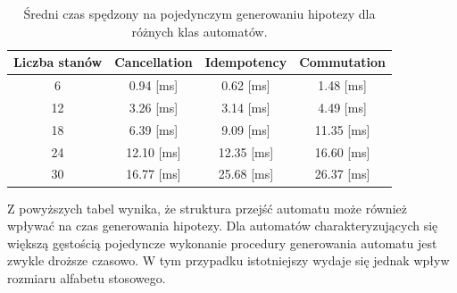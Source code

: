 \begin{table}[h]
    \centering
    \begin{tabular}{c|ccc}
        \hline
        Liczba stanów & Cancellation & Idempotency & Commutation \\
        \hline
        6 & 0.94 [ms] & 0.62 [ms] & 1.48 [ms] \\
        12 & 3.26 [ms] & 3.14 [ms] & 4.49 [ms] \\
        18 & 6.39 [ms] & 9.09 [ms] & 11.35 [ms] \\
        24 & 12.10 [ms] & 12.35 [ms] & 16.60 [ms] \\
        30 & 16.77 [ms] & 25.68 [ms] & 26.37 [ms] \\
        \hline
    \end{tabular}
    \caption{Średni czas spędzony na pojedynczym generowaniu hipotezy dla różnych klas automatów.}
\end{table}

\FloatBarrier

Z powyższych tabel wynika, że struktura przejść automatu może również wpływać na czas generowania hipotezy.
Dla automatów charakteryzujących się większą gęstością pojedyncze wykonanie procedury generowania automatu
jest zwykle droższe czasowo. W tym przypadku istotniejszy wydaje się jednak wpływ rozmiaru alfabetu stosowego.